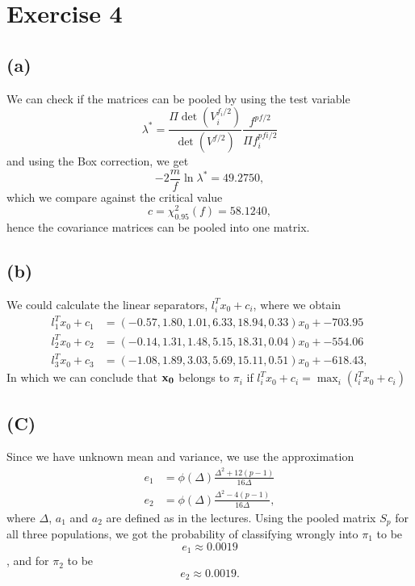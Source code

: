 
\section*{Exercise 4}
\label{sec:exercise-4}

\subsection*{(a)}
\label{sec:a-3}

We can check if the matrices can be pooled by using the test variable
\begin{equation*}
  \lambda^* = \frac{\Pi \det(V_i ^{f_i/2})}{\det(V^{f/2})}
  \frac{f^{pf/2}}{\Pi f_i ^{pfi/2}}
\end{equation*}
and using the Box correction, we get
\begin{equation*}
  -2  \frac{m}{f} \ln \lambda^* = 49.2750,
\end{equation*}
which we compare against the critical value
\begin{equation*}
  c = \chi^2_{0.95}(f) = 58.1240,
\end{equation*}
hence the covariance matrices can be pooled into one matrix.

\subsection*{(b)}
\label{sec:b-3}

We could calculate the linear separators, $ l_i^T x_0 + c_i$, where
we obtain
\begin{align*}
l_1^T x_0 + c_1 &= (-0.57, 1.80, 1.01, 6.33, 18.94, 0.33)x_0 + -703.95 \\ 
l_2^T x_0 + c_2 &= (-0.14, 1.31, 1.48, 5.15, 18.31, 0.04)x_0 + -554.06 \\ 
l_3^T x_0 + c_3 &= (-1.08, 1.89, 3.03, 5.69, 15.11, 0.51)x_0 + -618.43,
\end{align*}
In which we can conclude that ${\bf x_0}$ belongs to  $\pi_i$ if $
  l_i^T x_0 + c_i = \max_i \left(   l_i^T x_0 + c_i\right)
$

\subsection*{(C)}
\label{sec:c-3}

Since we have unknown mean and variance, we use the approximation 
\begin{align*}
  e_1 &= \phi(\Delta) \frac{\Delta^2 + 12(p-1)}{16\Delta} \\
  e_2 &=  \phi(\Delta)\frac{\Delta^2 - 4(p-1)}{16\Delta},
\end{align*}
where $\Delta$,  $a_1$ and $a_2$  are defined as in the lectures.
Using the pooled matrix $S_p$ for all three populations, we got the
probability of classifying wrongly into $\pi_1$ to be
\begin{equation*}
  e_1 \approx 0.0019
\end{equation*},
and for $\pi_2$ to be
\begin{equation*}
  e_2  \approx 0.0019.
\end{equation*}

